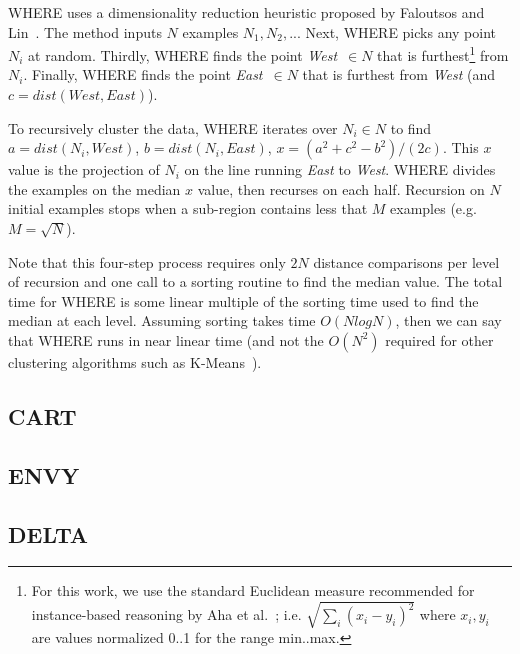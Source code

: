 WHERE uses a dimensionality reduction heuristic proposed by
Faloutsos and Lin~\cite{Faloutsos1995}. The method 
inputs
$N$
examples $N_1,N_2,..$. Next, WHERE
picks any
point $N_i$ at random. Thirdly, WHERE
finds the point  {\em West}~$\in N$ that is
furthest\footnote{
 For this work, we use the standard Euclidean measure recommended for
instance-based reasoning by Aha et al.~\cite{aha91};
i.e. $\sqrt{\sum_i(x_i-y_i)^2}$ where $x_i,y_i$ 
are values normalized 0..1 for the range min..max.}
from $N_i$.
Finally, WHERE
finds the point {\em East}~$\in N$
that is furthest from {\em West} (and 
$c=\mathit{dist}(\mathit{West},\mathit{East})$).

To recursively cluster the data, WHERE iterates over $N_i \in N$
to find
\mbox{$a=\mathit{dist}(N_i,\mathit{West})$},
\mbox{$b=\mathit{dist}(N_i,\mathit{East})$},
\mbox{$x=(a^2 + c^2 - b^2)/(2c)$}.
This  $x$ value is the projection of $N_i$
on the line  running  {\em East} to {\em West}.  WHERE divides
the examples on the median $x$ value,
then recurses on each half. 
Recursion on
$N$ initial
examples stops when a sub-region
contains less that  $M$ examples (e.g. 
$M=\sqrt{N}$).

Note that this four-step  
process requires only $2N$ distance comparisons
per level of recursion and one call to a sorting routine
to find the median value. 
The total time for WHERE is some linear multiple of the sorting time
used to find the median at each level.
Assuming sorting takes time $O(NlogN)$, then we can say 
that WHERE runs in near linear time
(and not the $O(N^2)$ required for 
other clustering algorithms such as K-Means~\cite{hamerly2010making}).

\subsection{CART}

\subsection{ENVY}

\subsection{DELTA}
